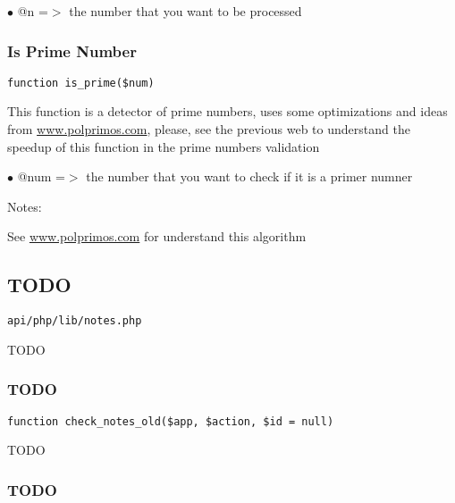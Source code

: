 \documentclass[a4paper]{article}
\def\htmladdnormallink#1#2{\href{#2}{#1}}
\begin{document}
\begin{compactitem}
\item[\color{myblue}$\bullet$] @n =$>$ the number that you want to be processed
\end{compactitem}

\hypertarget{toc495}{}
\subsubsection{Is Prime Number}

\begin{lstlisting}
function is_prime($num)
\end{lstlisting}

This function is a detector of prime numbers, uses some optimizations and
ideas from \htmladdnormallink{www.polprimos.com}{www.polprimos.com}, please, see the previous web to understand
the speedup of this function in the prime numbers validation

\begin{compactitem}
\item[\color{myblue}$\bullet$] @num =$>$ the number that you want to check if it is a primer numner
\end{compactitem}

Notes:

See \htmladdnormallink{www.polprimos.com}{www.polprimos.com} for understand this algorithm

\hypertarget{toc496}{}
\subsection{TODO}

\begin{lstlisting}
api/php/lib/notes.php
\end{lstlisting}

TODO

\hypertarget{toc497}{}
\subsubsection{TODO}

\begin{lstlisting}
function check_notes_old($app, $action, $id = null)
\end{lstlisting}

TODO

\hypertarget{toc498}{}
\subsubsection{TODO}
\end{document}
